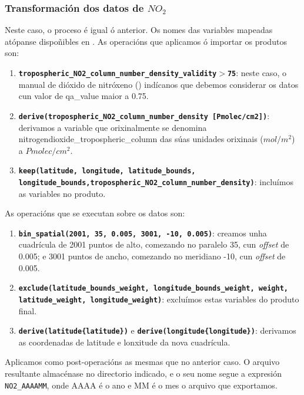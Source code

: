 \subsubsection{Transformación dos datos de $NO_2$}
Neste caso, o proceso é igual ó anterior. Os nomes das variables mapeadas atópanse dispoñibles en \cite{HARPNO2}. As operacións que aplicamos ó importar os produtos son:
\begin{enumerate}
    \item \texttt{\textbf{tropospheric\_NO2\_column\_number\_density\_validity$>$75}}: neste caso, o manual de dióxido de nitróxeno (\cite{NO2manual}) indícanos que debemos considerar os datos cun
    valor de qa\_value maior a 0.75.
    \item \texttt{\textbf{derive(tropospheric\_NO2\_column\_number\_density [Pmolec/cm2])}}: derivamos a variable que orixinalmente se denomina nitrogendioxide\_tropospheric\_\break column das súas
    unidades orixinais ($mol/m^2$) a $Pmolec/cm^2$.
    \item \texttt{\textbf{keep(latitude, longitude, latitude\_bounds, longitude\_bounds,\break tropospheric\_NO2\_column\_number\_density)}}: incluímos as variables no produto.
\end{enumerate}

As operacións que se executan sobre os datos son:
\begin{enumerate}
    \item \texttt{\textbf{bin\_spatial(2001, 35, 0.005, 3001, -10, 0.005)}}: creamos unha cuadrícula de 2001 puntos de alto, comezando no paralelo 35\textdegree, cun \textit{offset} de 0.005\textdegree;
    e 3001 puntos de ancho, comezando no meridiano -10\textdegree, cun \textit{offset} de 0.005.
    \item \texttt{\textbf{exclude(latitude\_bounds\_weight, longitude\_bounds\_weight, weight, latitude\_weight, longitude\_weight)}}: excluímos estas variables do produto final.
    \item \texttt{\textbf{derive(latitude\{latitude\})}} e  \texttt{\textbf{derive(longitude\{longitude\})}}: derivamos as coordenadas de latitude e lonxitude da nova cuadrícula.
\end{enumerate}

Aplicamos como post-operacións as mesmas que no anterior caso. O arquivo resultante almacénase no directorio indicado, e o seu nome segue a expresión \texttt{NO2\_AAAAMM}, onde AAAA é o ano e MM é o
mes o arquivo que exportamos.

